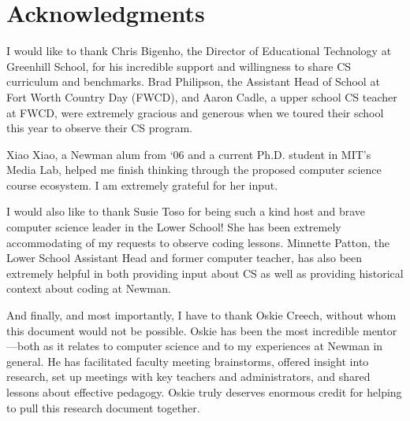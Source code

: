 
\chapter{Acknowledgments} %

\label{Acknowledgments} %

I would like to thank Chris Bigenho, the Director of Educational Technology at Greenhill School, for his incredible support and willingness to share CS curriculum and benchmarks. Brad Philipson, the Assistant Head of School at Fort Worth Country Day (FWCD), and Aaron Cadle, a upper school CS teacher at FWCD, were extremely gracious and generous when we toured their school this year to observe their CS program.\par
Xiao Xiao, a Newman alum from `06 and a current Ph.D. student in MIT's Media Lab, helped me finish thinking through the proposed computer science course ecosystem. I am extremely grateful for her input.\par

I would also like to thank Susie Toso for being such a kind host and brave computer science leader in the Lower School! She has been extremely accommodating of my requests to observe coding lessons. Minnette Patton, the Lower School Assistant Head and former computer teacher, has also been extremely helpful in both providing input about CS as well as providing historical context about coding at Newman. \par

And finally, and most importantly, I have to thank Oskie Creech, without whom this document would not be possible. Oskie has been the most incredible mentor---both as it relates to computer science and to my experiences at Newman in general. He has facilitated faculty meeting brainstorms, offered insight into research, set up meetings with key teachers and administrators, and shared lessons about effective pedagogy. Oskie truly deserves enormous credit for helping to pull this research document together.\par
